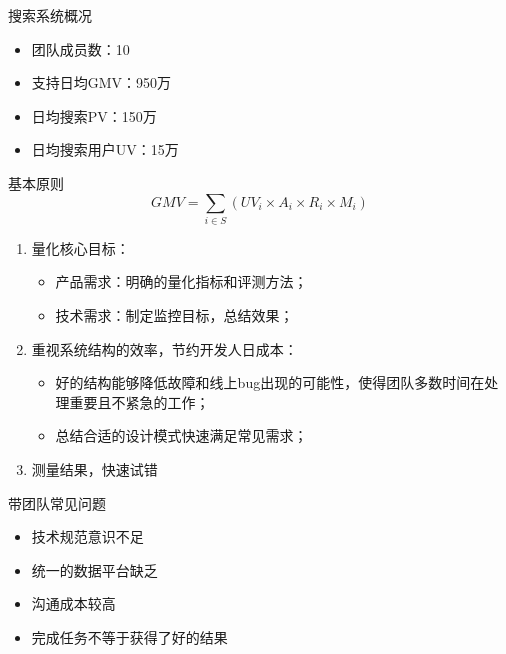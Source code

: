 \documentclass[handout]{beamer}
\begin{document}
\begin{CJK}{UTF8}{gbsn}
\begin{frame}{搜索系统概况}
  \begin{itemize}
  \item { 团队成员数：10 }
  \item { 支持日均GMV：950万 }
  \item { 日均搜索PV：150万 }
  \item { 日均搜索用户UV：15万 }
  \end{itemize}
\end{frame}

\begin{frame}{基本原则}
  $$ GMV = \sum_{i \in S}{(UV_i \times A_i \times R_i \times M_i)} $$
  \begin{enumerate}
  \item {
    量化核心目标：
    \begin{itemize}
    \item { 产品需求：明确的量化指标和评测方法； }
    \item { 技术需求：制定监控目标，总结效果； }
    \end{itemize}
  }
  \item {
    重视系统结构的效率，节约开发人日成本：
    \begin{itemize}
    \item { 好的结构能够降低故障和线上bug出现的可能性，使得团队多数时间在处理重要且不紧急的工作； }
    \item { 总结合适的设计模式快速满足常见需求； }
    \end{itemize}
  }
  \item {
    测量结果，快速试错
  }
  \end{enumerate}
\end{frame}

\begin{frame}{带团队常见问题}
  \begin{itemize}
    \item {技术规范意识不足}
    \item {统一的数据平台缺乏}
    \item {沟通成本较高}
    \item {完成任务不等于获得了好的结果}
  \end{itemize}
\end{frame}

\end{CJK}
\end{document}
